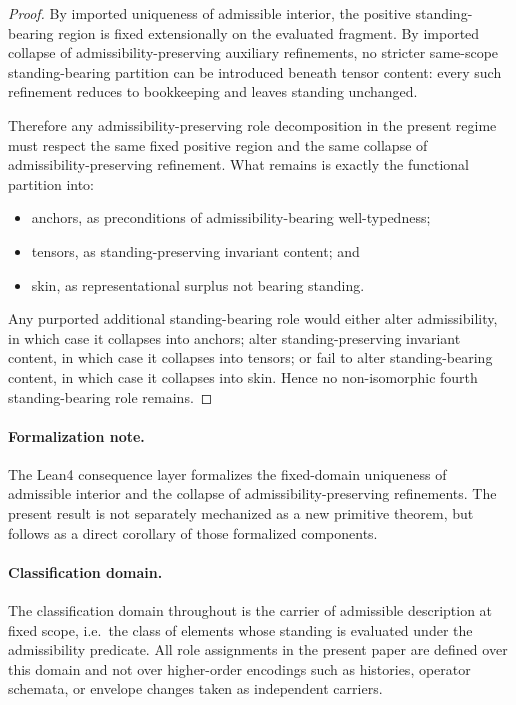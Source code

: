 \documentclass[12pt]{article}
\theoremstyle{plain}
\begin{document}
\begin{proof}
By imported uniqueness of admissible interior, the positive standing-bearing region is fixed extensionally on the evaluated fragment. By imported collapse of admissibility-preserving auxiliary refinements, no stricter same-scope standing-bearing partition can be introduced beneath tensor content: every such refinement reduces to bookkeeping and leaves standing unchanged.

Therefore any admissibility-preserving role decomposition in the present regime must respect the same fixed positive region and the same collapse of admissibility-preserving refinement. What remains is exactly the functional partition into:
\begin{itemize}
    \item anchors, as preconditions of admissibility-bearing well-typedness;
    \item tensors, as standing-preserving invariant content; and
    \item skin, as representational surplus not bearing standing.
\end{itemize}
Any purported additional standing-bearing role would either alter admissibility, in which case it collapses into anchors; alter standing-preserving invariant content, in which case it collapses into tensors; or fail to alter standing-bearing content, in which case it collapses into skin. Hence no non-isomorphic fourth standing-bearing role remains.
\end{proof}

\paragraph{Formalization note.}
The Lean4 consequence layer formalizes the fixed-domain uniqueness of admissible interior and the collapse of admissibility-preserving refinements. The present result is not separately mechanized as a new primitive theorem, but follows as a direct corollary of those formalized components.


\paragraph{Classification domain.}
The classification domain throughout is the carrier of admissible description at fixed scope, i.e.\ the class of elements whose standing is evaluated under the admissibility predicate. All role assignments in the present paper are defined over this domain and not over higher-order encodings such as histories, operator schemata, or envelope changes taken as independent carriers.
\end{document}
